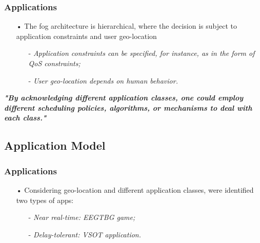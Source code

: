 \documentclass[10pt, pdf, xcolor=pdftex, dvipsnames, table]{beamer}
\begin{document}
\begin{frame}
	\frametitle{Applications}
 	\begin{block}{}
 		\begin{itemize}
 		    \item[•] The fog architecture is hierarchical, where the decision is subject to application constraints and user geo-location\newline
 				\begin{itemize}
 		    		\item[-] \footnotesize\textit{Application constraints can be specified, for instance, as in the form of QoS constraints;}\newline
 		    		\item[-] \footnotesize\textit{User geo-location depends on human behavior.}
 		    	\end{itemize}
 		\end{itemize}
 	\end{block}
 	\footnotesize\textit{\textbf{"By acknowledging different application classes, one could employ different scheduling policies, algorithms, or mechanisms to deal with each class."}}
\end{frame}

\subsection[Application Model]{Application Model}

\begin{frame}
	\frametitle{Applications}
 	\begin{block}{}
 		\begin{itemize}
 		    \item[•] Considering geo-location and different application classes, were identified two types of apps:\newline
 				\begin{itemize}
 		    		\item[-] \footnotesize\textit{Near real-time: EEGTBG game;}\newline
 		    		\item[-] \footnotesize\textit{Delay-tolerant: VSOT application.}
 		    	\end{itemize}
 		\end{itemize}
 	\end{block}
\end{frame}
\end{document}
